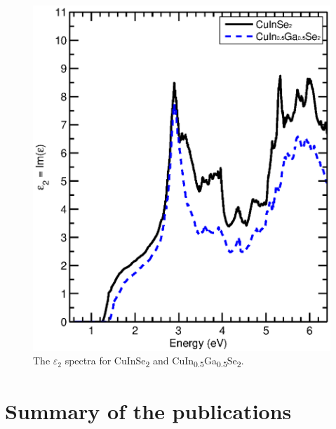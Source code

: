 \documentclass[a4paper, 12pt, titlepage,oneside,drop]{kthesis}
\begin{document}
\begin{figure}[H]
\begin{center}
\includegraphics[scale=0.5]{thesis2.eps}
\end{center}
\caption{The $\varepsilon_2$ spectra for CuInSe\textsubscript{2} and CuIn\textsubscript{0.5}Ga\textsubscript{0.5}Se\textsubscript{2}. }
\label{ccccc}
\end{figure}


\chapter{Summary of the publications}
\end{document}
